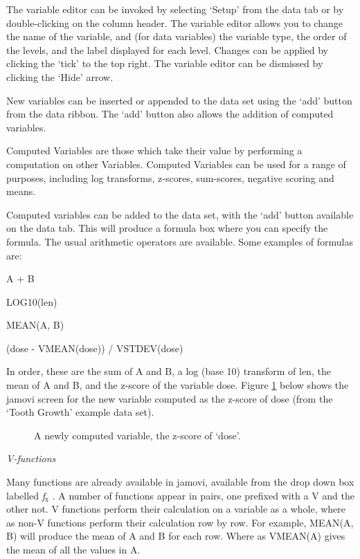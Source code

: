 The variable editor can be invoked by selecting ‘Setup’ from the data tab or by double-clicking on the column header. The variable editor allows you to change the name of the variable, and (for data variables) the variable type, the order of the levels, and the label displayed for each level. Changes can be applied by clicking the ‘tick’ to the top right. The variable editor can be dismissed by clicking the `Hide' arrow.

New variables can be inserted or appended to the data set using the ‘add’ button from the data ribbon. The ‘add’ button also allows the addition of computed variables.



Computed Variables are those which take their value by performing a computation on other Variables. Computed Variables can be used for a range of purposes, including log transforms, z-scores, sum-scores, negative scoring and means.

Computed variables can be added to the data set, with the ‘add’ button available on the data tab. This will produce a formula box where you can specify the formula. The usual arithmetic operators are available. Some examples of formulas are:

A + B

LOG10(len)

MEAN(A, B)

(dose - VMEAN(dose)) / VSTDEV(dose)

In order, these are the sum of A and B, a log (base 10) transform of len, the mean of A and B, and the z-score of the variable dose. Figure \ref{fig:computedvariable} below shows the jamovi screen for the new variable computed as the z-score of dose (from the `Tooth Growth' example data set).

\vspace*{1cm}
\begin{figure}[h]
\begin{center}
\caption{A newly computed variable, the z-score of `dose'.}
\label{fig:computedvariable}
\end{center}
\end{figure}


{\it V-functions}

Many functions are already available in jamovi, available from the drop down box labelled {\it f$_{\text{x}}$} . A number of functions appear in pairs, one prefixed with a V and the other not. V functions perform their calculation on a variable as a whole, where as non-V functions perform their calculation row by row. For example, MEAN(A, B) will produce the mean of A and B for each row. Where as VMEAN(A) gives the mean of all the values in A.

